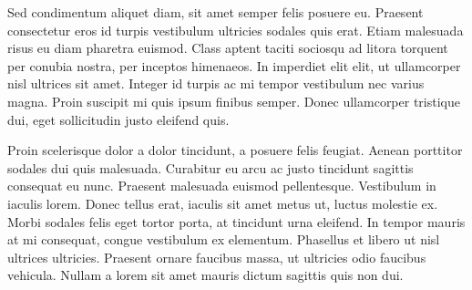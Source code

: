 Sed condimentum aliquet diam, sit amet semper felis posuere eu. Praesent consectetur eros id turpis vestibulum ultricies sodales quis erat. Etiam malesuada risus eu diam pharetra euismod. Class aptent taciti sociosqu ad litora torquent per conubia nostra, per inceptos himenaeos. In imperdiet elit elit, ut ullamcorper nisl ultrices sit amet. Integer id turpis ac mi tempor vestibulum nec varius magna. Proin suscipit mi quis ipsum finibus semper. Donec ullamcorper tristique dui, eget sollicitudin justo eleifend quis.

Proin scelerisque dolor a dolor tincidunt, a posuere felis feugiat. Aenean porttitor sodales dui quis malesuada. Curabitur eu arcu ac justo tincidunt sagittis consequat eu nunc. Praesent malesuada euismod pellentesque. Vestibulum in iaculis lorem. Donec tellus erat, iaculis sit amet metus ut, luctus molestie ex. Morbi sodales felis eget tortor porta, at tincidunt urna eleifend. In tempor mauris at mi consequat, congue vestibulum ex elementum. Phasellus et libero ut nisl ultrices ultricies. Praesent ornare faucibus massa, ut ultricies odio faucibus vehicula. Nullam a lorem sit amet mauris dictum sagittis quis non dui.